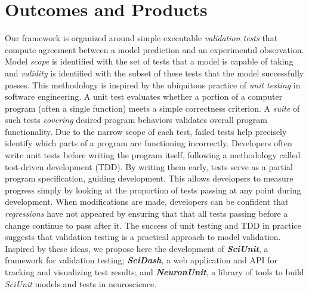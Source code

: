 \documentclass[11pt,letterpaper]{article}
\begin{document}
\section{Outcomes and Products}
Our framework is organized around simple executable \emph{validation tests} that compute agreement between a model prediction and an experimental observation. Model \textit{scope} is identified with the set of tests that a model is capable of taking and \textit{validity} is identified with the subset of these tests that the model successfully passes. This methodology is inspired by the ubiquitous practice of \emph{unit testing} in software engineering. A unit test evaluates whether a portion of a computer program (often a single function) meets a simple correctness criterion. A \textit{suite} of such tests \emph{covering} desired program behaviors validates overall program functionality. Due to the narrow scope of each test, failed tests help precisely identify which parts of a program are functioning incorrectly. Developers often write unit tests before writing the program itself, following a methodology called test-driven development (TDD)\cite{beck2003}. By writing them early, tests serve as a partial program specification, guiding development. This allows developers to measure progress simply by looking at the proportion of tests passing at any point during development. When modifications are made, developers can be confident that \emph{regressions} have not appeared by ensuring that that all tests passing before a change continue to pass after it.  The success of unit testing and TDD in practice suggests that validation testing is a practical approach to model validation.  Inspired by these ideas, we propose here the development of \textbf{\textit{SciUnit}}, a framework for validation testing; \textbf{\textit{SciDash}}, a web application and API for tracking and visualizing test results; and \textbf{\textit{NeuronUnit}}, a library of tools to build \textit{SciUnit} models and tests in neuroscience.    
\end{document}
